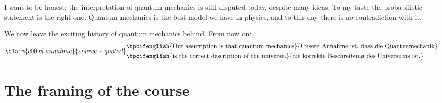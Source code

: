 I want to be honest: the interpretation of quantum mechanics is still disputed today, despite
many ideas. To my taste the probabilistic statement is the right one. Quantum mechanics is the
best model we have in physics, and to this day there is no contradiction with it.

We now leave the exciting history of quantum mechanics behind. From now on:
\begin{equation}\label{c00.eq.annahme}\claim{c00.cl.annahme}{source-quoted}
  \begin{aligned}
    &\text{\tpcifenglish{Our assumption is that quantum mechanics}{Unsere Annahme ist, dass die Quantenmechanik}} \\
    &\text{\tpcifenglish{is the correct description of the universe.}{die korrekte Beschreibung des Universums ist.}}
  \end{aligned}
\end{equation}

\section{The framing of the course}\label{c00.s1}

